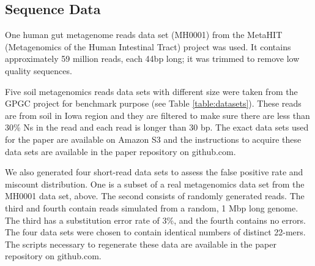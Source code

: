 \subsection{Sequence Data}

One human gut metagenome reads data set (MH0001) from the 
MetaHIT (Metagenomics of the Human Intestinal Tract) project \cite{Qin2010} was used. 
It contains approximately 59 million reads, each 44bp long; it was trimmed to remove 
low quality sequences. 

Five soil metagenomics reads data sets with different size were taken
from the GPGC project for benchmark purpose (see Table
\ref{table:datasets}).  These reads are from soil in Iowa region and they
are filtered to make sure there are less than 30\% Ns in the read and
each read is longer than 30 bp.  The exact data sets used for the
paper are available on Amazon S3 and the instructions to acquire these
data sets are available in the paper repository on github.com.

We also generated four short-read data sets to assess the false
positive rate and miscount distribution. One is a subset of a real
metagenomics data set from the MH0001 data set, above. The second
consists of randomly generated reads. The third and fourth contain
reads simulated from a random, 1 Mbp long genome.  The third has a
substitution error rate of 3\%, and the fourth contains no errors. The
four data sets were chosen to contain identical numbers of distinct
22-mers.  The scripts necessary to regenerate these data are available
in the paper repository on github.com.



